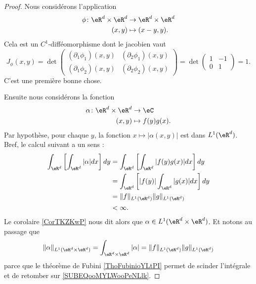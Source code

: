 \begin{proof}
	Nous considérons l'application
	\begin{equation}
		\begin{aligned}
			\phi\colon \eR^d\times \eR^d & \to \eR^d\times \eR^d \\
			(x,y)                        & \mapsto (x-y,y).
		\end{aligned}
	\end{equation}
	Cela est un \( C^1\)-difféomorphisme dont le jacobien vaut
	\begin{equation}
		J_{\phi}(x,y)=\det\begin{pmatrix}
			(\partial_1\phi_1)(x,y) & (\partial_2\phi_1)(x,y) \\
			(\partial_1\phi_2)(x,y) & (\partial_2\phi_2)(x,y)
		\end{pmatrix}=\det\begin{pmatrix}
			1 & -1 \\
			0 & 1
		\end{pmatrix}=1.
	\end{equation}
	C'est une première bonne chose.

	Ensuite nous considérons la fonction
	\begin{equation}
		\begin{aligned}
			\alpha\colon \eR^d\times \eR^d & \to \eC           \\
			(x,y)                          & \mapsto f(y)g(x).
		\end{aligned}
	\end{equation}
	Par hypothèse, pour chaque \( y\), la fonction \( x\mapsto |\alpha(x,y)|\) est dans \( L^1(\eR^d)\). Bref, le calcul suivant a un sens :
	\begin{subequations}
		\begin{align}
			\int_{\eR^d}\left[ \int_{\eR^d}| \alpha |dx \right]dy & =\int_{\eR^d}\left[ \int_{\eR^d}| f(y)g(x) |dx \right]dy               \\
			                                                      & =\int_{\eR^d}\left[ | f(y) |\int_{\eR^d}| g(x) |dx \right]dy           \\
			                                                      & =\| f \|_{L^1(\eR^d)}\| g \|_{L^1(\eR^d)}  \label{SUBEQooMYLWooPeNLlk} \\
			                                                      & <\infty.
		\end{align}
	\end{subequations}
	Le corolaire \ref{CorTKZKwP} nous dit alors que \( \alpha\in L^1(\eR^d\times \eR^d)\). Et notons au passage que
	\begin{equation}        \label{EQooLCWNooHLLdRd}
		\| \alpha \|_{L^1(\eR^d\times \eR^d)} =\int_{\eR^d\times \eR^d}| \alpha | =\| f \|_{L^1(\eR^d)}\| g \|_{L^1(\eR^d)}
	\end{equation}
	parce que le théorème de Fubini \ref{ThoFubinioYLtPI} permet de scinder l'intégrale et de retomber sur \eqref{SUBEQooMYLWooPeNLlk}.


\end{proof}
